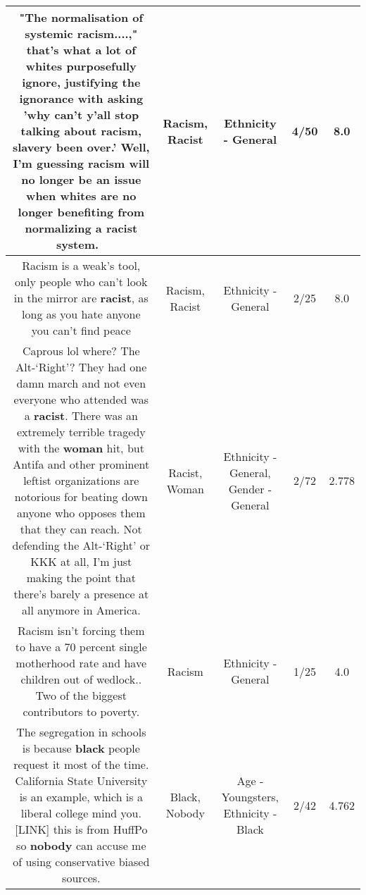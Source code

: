 \documentclass[11pt]{article}
\newlength\mylength
\begin{document}
\begin{center}
\begin{longtable}{|C{.65\mylength}|C{.30\mylength}|C{.12\mylength}|C{.12\mylength}|C{.12\mylength}|}
  \small "The normalisation of systemic \textbf{racism}....," that's what a lot of whites purposefully ignore, justifying the ignorance with asking 'why can't y'all stop talking about \textbf{racism}, slavery been over.'  Well, I'm guessing \textbf{racism} will no longer be an issue when whites are no longer benefiting from normalizing a \textbf{racist} system. 🤔\normalsize   & Racism, Racist & Ethnicity - General & 4/50 & 8.0 \\  \hline
  \small Racism is a weak's tool, only people who can't look in the mirror are \textbf{racist}, as long as you hate anyone you can't find peace\normalsize   & Racism, Racist & Ethnicity - General & 2/25 & 8.0 \\  \hline
  \small Caprous lol where? The Alt-‘Right'? They had one damn march and not even everyone who attended was a \textbf{racist}. There was an extremely terrible tragedy with the \textbf{woman} hit, but Antifa and other prominent leftist organizations are notorious for beating down anyone who opposes them that they can reach. Not defending the Alt-‘Right' or KKK at all, I'm just making the point that there's barely a presence at all anymore in America.\normalsize   & Racist, Woman & Ethnicity - General, Gender - General & 2/72 & 2.778 \\  \hline
  \small Racism isn't forcing them to have a 70 percent single motherhood rate and have children out of wedlock.. Two of the biggest contributors to poverty.\normalsize   & Racism & Ethnicity - General & 1/25 & 4.0 \\  \hline
  \small The segregation in schools is because \textbf{black} people request it most of the time. California State University is an example, which is a liberal college mind you.   [LINK]  this is from HuffPo so \textbf{nobody} can accuse me of using conservative biased sources.\normalsize   & Black, Nobody & Age - Youngsters, Ethnicity - Black & 2/42 & 4.762 \\  \hline

\end{longtable}
\end{center}
\end{document}
